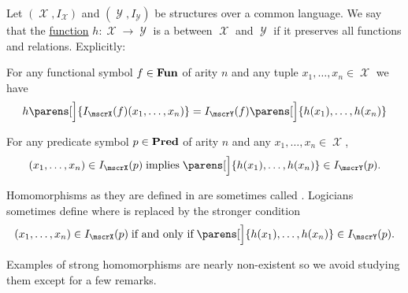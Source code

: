 \begin{definition}\label{def:first_order_homomorphism}
  Let \( (\mscrX, I_\mscrX) \) and \( (\mscrY, I_\mscrY) \) be structures over a common language. We say that the \hyperref[def:function]{function} \( h: \mscrX \to \mscrY \) is a  between \( \mscrX \) and \( \mscrY \) if it preserves all functions and relations. Explicitly:
  \begin{thmenum}
     For any functional symbol \( f \in \operatorname{\mathbf{Fun}} \) of arity \( n \) and any tuple \( x_1, \ldots, x_n \in \mscrX \) we have
    \begin{equation*}
      h\parens[\Big]{ I_\mscrX(f)(x_1, \ldots, x_n) } = I_\mscrY(f) \parens[\Big]{ h(x_1), \ldots, h(x_n) }
    \end{equation*}

     For any predicate symbol \( p \in \operatorname{\mathbf{Pred}} \) of arity \( n \) and any \( x_1, \ldots, x_n \in \mscrX \),
    \begin{equation*}
      (x_1, \ldots, x_n) \in I_\mscrX(p) \T{implies} \parens[\Big]{ h(x_1), \ldots, h(x_n) } \in I_\mscrY(p).
    \end{equation*}
  \end{thmenum}
\end{definition}

\begin{remark}\label{rem:first_order_strong_homomorphism}
  Homomorphisms as they are defined in  are sometimes called . Logicians sometimes define  where  is replaced by the stronger condition
  \begin{equation*}
    (x_1, \ldots, x_n) \in I_\mscrX(p) \T{if and only if} \parens[\Big]{ h(x_1), \ldots, h(x_n) } \in I_\mscrY(p).
  \end{equation*}

  Examples of strong homomorphisms are nearly non-existent so we avoid studying them except for a few remarks.
\end{remark}

